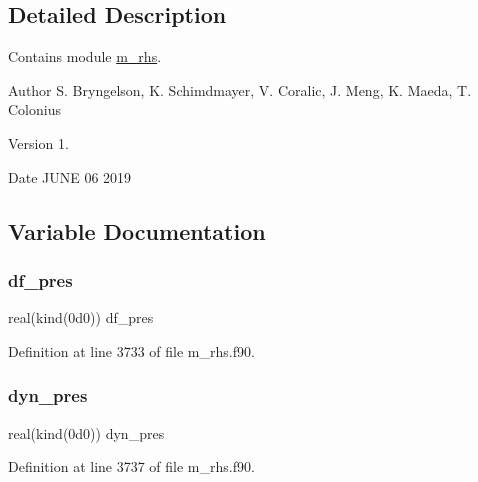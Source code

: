 \subsection{Detailed Description}
Contains module \hyperlink{namespacem__rhs}{m\+\_\+rhs}. 

\begin{DoxyAuthor}{Author}
S. Bryngelson, K. Schimdmayer, V. Coralic, J. Meng, K. Maeda, T. Colonius 
\end{DoxyAuthor}
\begin{DoxyVersion}{Version}
1. 
\end{DoxyVersion}
\begin{DoxyDate}{Date}
J\+U\+NE 06 2019 
\end{DoxyDate}


\subsection{Variable Documentation}
\mbox{\label{m__rhs_8f90_afab53b80fef38424acbbd772be46d333}} 
\subsubsection{\texorpdfstring{df\+\_\+pres}{df\_pres}}
{\footnotesize\ttfamily real(kind(0d0)) df\+\_\+pres}



Definition at line 3733 of file m\+\_\+rhs.\+f90.

\mbox{\label{m__rhs_8f90_a2d84a02a65f699f43818db9feca4e25d}} 
\subsubsection{\texorpdfstring{dyn\+\_\+pres}{dyn\_pres}}
{\footnotesize\ttfamily real(kind(0d0)) dyn\+\_\+pres}



Definition at line 3737 of file m\+\_\+rhs.\+f90.

\mbox{\label{m__rhs_8f90_a4cb69ecc8e60cb3bfbe57aab771d6c48}} 
